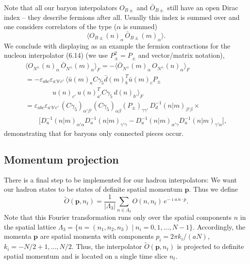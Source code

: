 Note that all our baryon interpolators $O_{B\pm}$ and $\bar{O}_{B\pm}$ still
have an open Dirac index -- they describe fermions after all. Usually this
index is summed over and one considers correlators of the type ($\alpha$ is
summed)
\begin{equation}
  \big\langle O_{B\pm}(n)_\alpha\, \bar{O}_{B\pm}(m)_\alpha \big\rangle .
\end{equation}
We conclude with displaying as an example the fermion contractions for the
nucleon interpolator (6.14) (we use $P_\pm^2 = P_\pm$ and vector/matrix
notation),
\begin{equation}
  \begin{gathered}
    \big\langle O_{N^\pm}(n)_\alpha\, \bar{O}_{N^\pm}(m)_\alpha \big\rangle_F
    = -\big\langle \bar{O}_{N^\pm}(m)_\alpha\, O_{N^\pm}(n)_\alpha \big\rangle_F \\
    = -\varepsilon_{abc}\varepsilon_{a'b'c'}\,
      \Big\langle \bar u(m)_a C\gamma_5 \bar d(m)_b^T \bar u(m)_c P_\pm \\
    \qquad\qquad u(n)_{c'}\, u(n)_{a'}^T C\gamma_5\, d(n)_{b'} \Big\rangle_F \\
    = \varepsilon_{abc}\varepsilon_{a'b'c'}\, (C\gamma_5)_{\alpha'\beta'}
      (C\gamma_5)_{\alpha\beta} (P_\pm)_{\gamma\gamma'}\,
      D_d^{-1}(n|m)_{\beta'\beta} \times \\
    \qquad \Big[ D_u^{-1}(n|m)_{\alpha'\alpha} D_u^{-1}(n|m)_{\gamma'\gamma}
      - D_u^{-1}(n|m)_{\alpha'\gamma} D_u^{-1}(n|m)_{\gamma'\alpha} \Big] ,
  \end{gathered}
\end{equation}
demonstrating that for baryons only connected pieces occur.

\subsection{Momentum projection}

There is a final step to be implemented for our hadron interpolators: We want
our hadron states to be states of definite spatial momentum $\mathbf{p}$. Thus
we define
\begin{equation}
  \widetilde{O}(\mathbf{p}, n_t) = \frac{1}{|\Lambda_3|}
    \sum_{n\in\Lambda_3} O(n, n_t)\, e^{-\imath a\, n\cdot p} .
\end{equation}
Note that this Fourier transformation runs only over the spatial components
$n$ in the spatial lattice $\Lambda_3 = \{ n = (n_1, n_2, n_3) \mid n_i = 0, 1,
\ldots, N-1 \}$. Accordingly, the momenta $\mathbf{p}$ are spatial momenta with
components $p_i = 2\pi k_i/(aN)$, $k_i = -N/2 + 1, \ldots, N/2$. Thus, the
interpolator $\widetilde{O}(\mathbf{p}, n_t)$ is projected to definite spatial
momentum and is located on a single time slice $n_t$.

